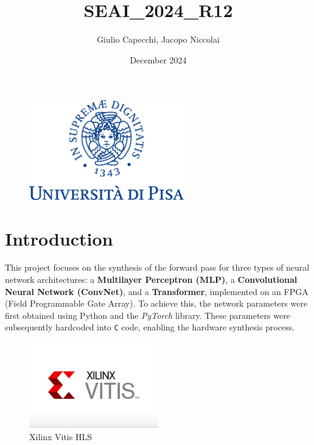 \documentclass{article}
\title{SEAI\_2024\_R12}
\author{Giulio Capecchi, Jacopo Niccolai}
\date{December 2024}
\begin{document}
\maketitle

\vspace{3cm}
\begin{figure}[H]
    \centering
    \includegraphics[width=0.6\textwidth]{assets/unipi.png}
    \label{fig:unipi_logo}
\end{figure}

\newpage

\tableofcontents

\newpage

\section{Introduction}
This project focuses on the synthesis of the forward pass for three types of neural network architectures: a \textbf{Multilayer Perceptron (MLP)}, a \textbf{Convolutional Neural Network (ConvNet)}, and a \textbf{Transformer}, implemented on an FPGA (Field Programmable Gate Array).  
To achieve this, the network parameters were first obtained using Python and the \textit{PyTorch} library. These parameters were subsequently hardcoded into \texttt{C} code, enabling the hardware synthesis process.


\begin{figure}[H]
    \centering
    \includegraphics[width=0.5\textwidth]{assets/vitis-hls.png}
    \caption{Xilinx Vitis HLS}
    \label{fig:vitis_hls}
\end{figure}
\end{document}

